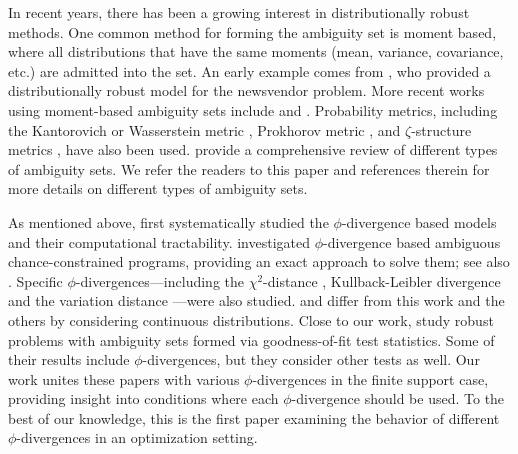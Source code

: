 \documentclass[opre,nonblindrev]{informs3} %
\begin{document}
In recent years, there has been a growing interest in distributionally robust methods.
One common method for forming the ambiguity set is moment based, where all distributions that have the same moments (mean, variance, covariance, etc.) are admitted into the set.
An early example comes from \citet{scarf1958min}, who provided a distributionally robust model for the newsvendor problem.
More recent works using moment-based ambiguity sets include \cite{delage2010distributionally} and \cite{wiesemann2013distributionally}. 
Probability metrics, including the Kantorovich or Wasserstein metric \citep{pflug2007ambiguity,eskuhn_15}, Prokhorov metric \citep{erdogan2006ambiguous}, and $\zeta$-structure metrics \citep{zhao2015}, have also been used. %
\cite{hanasusanto_etal_15} provide a comprehensive review of different types of ambiguity sets. 
We refer the readers to this paper and references therein for more details on different types of ambiguity sets. 

As mentioned above, \cite{bental2013robust} first systematically studied the $\phi$-divergence based models and their computational tractability. 
\cite{jiang2012data} investigated $\phi$-divergence based ambiguous chance-constrained programs, providing an exact approach to solve them; see also \cite{yanikoglu2012}. 
Specific $\phi$-divergences---including the $\chi^2$-distance \citep{klabjan2013robust}, Kullback-Leibler divergence \citep{calafiore2007ambiguous,hukullback,wang2010likelihood} and the variation distance \citep{jiang2015variation}---were also studied. 
\citet{hukullback} and \citet{jiang2015variation} differ from this work and the others by considering continuous distributions.
Close to our work, \cite{bertsimas_gupta_kallus_14} study robust problems with ambiguity sets formed via goodness-of-fit test statistics. Some of their results include $\phi$-divergences, but they consider other tests as well. 
Our work unites these papers with various $\phi$-divergences in the finite support case, providing insight into conditions where each $\phi$-divergence should be used. 
To the best of our knowledge, this is the first paper examining the behavior of different $\phi$-divergences in an optimization setting. 

\end{document}

